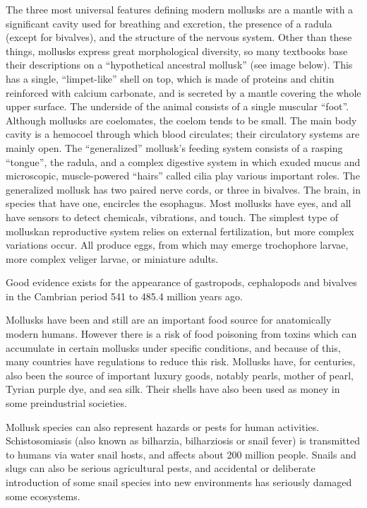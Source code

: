 \documentclass[]{book}
\begin{document}
The three most universal features defining modern mollusks are a mantle with a significant cavity used for breathing and excretion, the presence of a radula (except for bivalves), and the structure of the nervous system. Other than these things, mollusks express great morphological diversity, so many textbooks base their descriptions on a ``hypothetical ancestral mollusk'' (see image below). This has a single, ``limpet-like'' shell on top, which is made of proteins and chitin reinforced with calcium carbonate, and is secreted by a mantle covering the whole upper surface. The underside of the animal consists of a single muscular ``foot''. Although mollusks are coelomates, the coelom tends to be small. The main body cavity is a hemocoel through which blood circulates; their circulatory systems are mainly open. The ``generalized'' mollusk's feeding system consists of a rasping ``tongue'', the radula, and a complex digestive system in which exuded mucus and microscopic, muscle-powered ``hairs'' called cilia play various important roles. The generalized mollusk has two paired nerve cords, or three in bivalves. The brain, in species that have one, encircles the esophagus. Most mollusks have eyes, and all have sensors to detect chemicals, vibrations, and touch. The simplest type of molluskan reproductive system relies on external fertilization, but more complex variations occur. All produce eggs, from which may emerge trochophore larvae, more complex veliger larvae, or miniature adults.

Good evidence exists for the appearance of gastropods, cephalopods and bivalves in the Cambrian period 541 to 485.4 million years ago.

Mollusks have been and still are an important food source for anatomically modern humans. However there is a risk of food poisoning from toxins which can accumulate in certain mollusks under specific conditions, and because of this, many countries have regulations to reduce this risk. Mollusks have, for centuries, also been the source of important luxury goods, notably pearls, mother of pearl, Tyrian purple dye, and sea silk. Their shells have also been used as money in some preindustrial societies.

Mollusk species can also represent hazards or pests for human activities. Schistosomiasis (also known as bilharzia, bilharziosis or snail fever) is transmitted to humans via water snail hosts, and affects about 200 million people. Snails and slugs can also be serious agricultural pests, and accidental or deliberate introduction of some snail species into new environments has seriously damaged some ecosystems.
\end{document}
